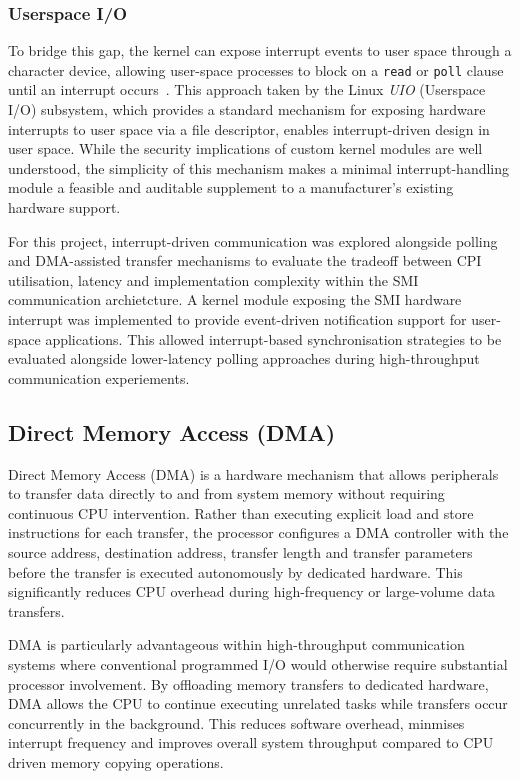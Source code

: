 \documentclass[final]{cmpreport}
\begin{document}
\subsubsection{Userspace I/O}
To bridge this gap, the kernel can expose interrupt events to user space through a character device, allowing user-space processes to block on a \texttt{read} or \texttt{poll} clause until an interrupt occurs~\cite{UserspaceHOWTOLinux}. This approach taken by the Linux \textit{UIO} (Userspace I/O) subsystem, which provides a standard mechanism for exposing hardware interrupts to user space via a file descriptor, enables interrupt-driven design in user space. While the security implications of custom kernel modules are well understood, the simplicity of this mechanism makes a minimal interrupt-handling module a feasible and auditable supplement to a manufacturer's existing hardware support.

For this project, interrupt-driven communication was explored alongside polling and DMA-assisted transfer mechanisms to evaluate the tradeoff between CPI utilisation, latency and implementation complexity within the SMI communication archietcture. A kernel module exposing the SMI hardware interrupt was implemented to provide event-driven notification support for user-space applications. This allowed interrupt-based synchronisation strategies to be evaluated alongside lower-latency polling approaches during high-throughput communication experiements.

\subsection{Direct Memory Access (DMA)}
Direct Memory Access (DMA) is a hardware mechanism that allows peripherals to transfer data directly to and from system memory without requiring continuous CPU intervention. Rather than executing explicit load and store instructions for each transfer, the processor configures a DMA controller with the source address, destination address, transfer length and transfer parameters before the transfer is executed autonomously by dedicated hardware. This significantly reduces CPU overhead during high-frequency or large-volume data transfers.

DMA is particularly advantageous within high-throughput communication systems where conventional programmed I/O would otherwise require substantial processor involvement. By offloading memory transfers to dedicated hardware, DMA allows the CPU to continue executing unrelated tasks while transfers occur concurrently in the background. This reduces software overhead, minmises interrupt frequency and improves overall system throughput compared to CPU driven memory copying operations.
\end{document}
